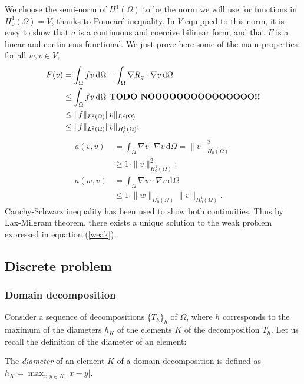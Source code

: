 We choose the semi-norm of $H^1(\Omega)$ to be the norm we will use for functions in $H^1_0(\Omega) = V$, thanks to Poincaré inequality. In $V$ equipped to this norm, it is easy to show that $a$ is a continuous and coercive bilinear form, and that $F$ is a linear and continuous functional. We just prove here some of the main properties: for all $w,v\in V$, 
\begin{align*}
F(v) &= \int_\Omega fv \, \mathrm{d}\Omega -\int_\Omega \nabla R_g \cdot \nabla v \, \mathrm{d} \Omega \\
& \leq \int_\Omega fv \, \mathrm{d}\Omega \text{\textbf{ TODO NOOOOOOOOOOOOOOO!!}}\\
& \leq \|f\|_{L^2(\Omega)}\|v\|_{L^2(\Omega)}\\
& \leq \|f\|_{L^2(\Omega)}\|v\|_{H_0^1(\Omega)};
\end{align*}
\begin{align}
a(v,v) &= \int_\Omega \nabla v \cdot \nabla v \, \mathrm{d} \Omega = \|v\|^2_{H_0^1(\Omega)} \nonumber \\
& \geq 1\cdot \|v\|^2_{H_0^1(\Omega)}; \label{acoercive}\\
a(w,v) &= \int_\Omega \nabla w \cdot \nabla v \, \mathrm{d} \Omega \nonumber \\
& \leq 1 \cdot \|w\|_{H_0^1(\Omega)}\|v\|_{H_0^1(\Omega)}.\nonumber
\end{align} 
Cauchy-Schwarz inequality has been used to show both continuities. Thus by Lax-Milgram theorem, there exists a unique solution to the weak problem expressed in equation (\ref{weak}). 


\subsection{Discrete problem}

\subsubsection{Domain decomposition}
Consider a sequence of decompositions $\{T_h\}_h$ of $\Omega$, where $h$ corresponds to the maximum of the diameters $h_K$ of the elements $K$ of the decomposition $T_h$. Let us recall the definition of the diameter of an element: 

\begin{definition}[Diameter]
The \textit{diameter} of an element $K$ of a domain decomposition is defined as $h_K = \max_{x,y\in K}|x-y|$. 
\end{definition}

